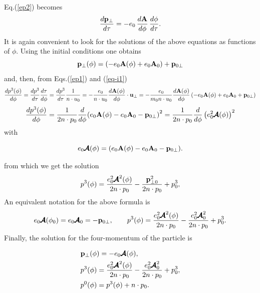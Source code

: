 Eq.(\ref{ep2}) becomes
\begin{equation}
    \frac{d{\bf p}_{\perp}}{d\tau}=-e_0\,\frac{d{\bf A}}{d\phi}\,\frac{d\phi}{d\tau}.
\end{equation}
It is again convenient to look for the solutions of the above equations as functions of \(\phi\).  Using the initial conditions one obtains
\begin{equation}\label{eq-i1}
    {\bf p}_{\perp}(\phi)=\left(-e_0{\bf A}(\phi)+e_0{\bf A}_0\right)+ {\bf p}_{0\perp}
\end{equation}
and, then, from Eqs.(\ref{ep1}) and (\ref{eq-i1})
\begin{align}
    \frac{dp^3(\phi)}{d\phi}= \frac{dp^3}{d\tau}\frac{d\tau}{d\phi} = \frac{dp^3}{d\tau}\frac1{n\cdot u_0}=-\frac{e_0}{n\cdot u_0}\frac{d{\bf A}(\phi)}{d\phi}\cdot{\bf u}_{\perp} = -\frac{e_0}{m_0 n\cdot u_0}\frac{d{\bf A}(\phi)}{d\phi}\left(-e_0{\bf A}(\phi)+e_0{\bf A}_0+ {\bf p}_{0\perp}\right)
\end{align}
\begin{equation}
    \frac{dp^3(\phi)}{d\phi}=\frac{1}{2n \cdot p_0}\frac{d}{d\phi}{\left(e_0{\bf A}(\phi)-e_0{\bf A}_0-{\bf p}_{0\perp}\right)^2} = \frac1{2n\cdot p_0}\frac{d}{d\phi}\left(e_0^2{\pmb{\cal A}}(\phi)\right)^2
\end{equation}
with\begin{importantbox}
    \begin{equation}
        e_0{\pmb{\cal A}}(\phi)=(e_0{\bf A}(\phi)-e_0{\bf A}_0 - {\bf p}_{0\perp}).
    \end{equation}
\end{importantbox}
from which we get the solution
\begin{equation}
    p^3(\phi)=\frac{e_0^2{\pmb{\cal A}}^2(\phi)}{2n\cdot p_0}-\frac{{\bf p}_{\perp0}^2}{2n\cdot p_0}+p_{0}^3,
\end{equation}
An equivalent notation for the above formula is
\begin{equation}
    e_0{\pmb{\cal A}}(\phi_0) = e_0{\pmb{\cal A}}_0 =- {\bf p}_{0\perp}, \qquad p^3(\phi)=\frac{e_0^2{\pmb{\cal A}}^2(\phi)}{2n\cdot p_0}-\frac{e_0^2{\pmb{\cal A}}^2_0}{2n\cdot p_0}+p_{0}^3.
\end{equation}
Finally, the solution for the four-momentum of the particle is
\begin{importantbox}
    \begin{align}
         & {\bf p}_{\perp}(\phi)  = -e_0{\pmb{\cal A}}(\phi),                                                                            \\
         & p^3(\phi)              = \frac{e_0^2{\pmb{\cal A}}^2(\phi)}{2n\cdot p_0}-\frac{e_0^2{\pmb{\cal A}}^2_0}{2n\cdot p_0}+p_{0}^3, \\
         & p^0(\phi)              = p^3(\phi) + n\cdot p_0.
    \end{align}\end{importantbox}
